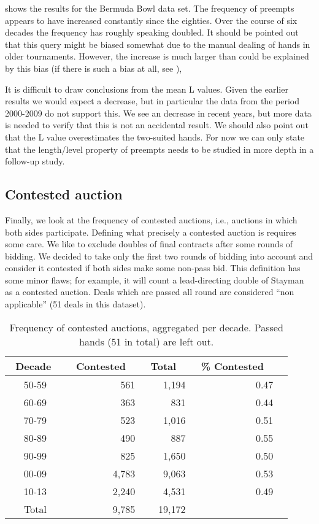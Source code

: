 \documentclass{llncs}
\begin{document}
 shows the results for the Bermuda Bowl data set. The
frequency of preempts appears to have increased constantly since the
eighties. Over the course of six decades the frequency has roughly
speaking doubled. It should be pointed out that this query might be
biased somewhat due to the manual dealing of hands in older
tournaments. However, the increase is much larger than could be
explained by this bias (if there is such a bias at all, see
),

It is difficult to draw conclusions from the mean L values. Given the
earlier results we would expect a decrease, but in particular the data
from the period 2000-2009 do not support this.  We see an decrease in
recent years, but more data is needed to verify that this is not an
accidental result.  We should also point out that the L value
overestimates the two-suited hands.  For now we can only state that
the length/level property of preempts needs to be studied in more
depth in a follow-up study.

\subsection{Contested auction}

Finally, we look at the frequency of contested auctions, i.e.,
auctions in which both sides participate. Defining what precisely a
contested auction is requires some care. We like to exclude doubles of
final contracts after some rounds of bidding. We decided to take only
the first two rounds of bidding into account and consider it contested
if both sides make some non-pass bid. This definition has some minor
flaws; for example, it will count a lead-directing double of Stayman
as a contested auction.  Deals which are passed all round are
considered ``non applicable'' (51 deals in this dataset).

\begin{table}
\caption{Frequency of contested auctions, aggregated per
decade. Passed hands (51 in total) are left out.}  
\label{tbl:contested-auction}
\centering\footnotesize
\begin{tabular}{|c|r|r|r|r|}
\hline
\bf \ Decade \ & \bf \ Contested \ & \bf \ Total \  & 
\bf \ \% Contested \ \\ \hline
50-59 & 561 & 1,194 & 0.47 \\
60-69 & 363 & 831 & 0.44\\
70-79 & 523 & 1,016 & 0.51\\
80-89 & 490 & 887 & 0.55\\
90-99 & 825 & 1,650 & 0.50\\
00-09 & 4,783 & 9,063 & 0.53\\
10-13 & 2,240 & 4,531 & 0.49\\
\hline
Total  & 9,785 & 19,172 & \\ 
\hline
\end{tabular}
\end{table}
\end{document}

